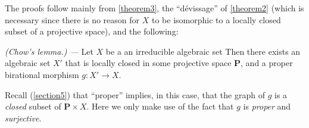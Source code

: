 \documentclass{article}
\theoremstyle{plain}
\newenvironment{lemma}[1]
    {\renewcommand\theinnercustomlemma{#1}\innercustomlemma}
    {\endinnercustomlemma}
\theoremstyle{definition}
\newcommand{\oldpage}[1]{\marginpar{\footnotesize$\Big\vert$ \textit{p.~#1}}}
\begin{document}
The proofs follow mainly from \cref{theorem3}, the ``d\'{e}vissage'' of \cref{theorem2} (which is necessary since there is no reason for $X$ to be isomorphic to a locally closed subset of a projective space), and the following:

\begin{lemma}{4}
\label{lemma4}
\emph{(Chow's lemma.) ---}
  Let $X$ be a an irreducible algebraic set
  Then there exists an algebraic set $X'$ that is locally closed in some projective space $\mathbf{P}$, and a proper birational morphism $g\colon X'\to X$.
\end{lemma}

Recall (\cref{section5}) that ``proper'' implies, in this case, that the graph of $g$
\oldpage{2-11}
is a \emph{closed} subset of $\mathbf{P}\times X$.
Here we only make use of the fact that $g$ is \emph{proper} and \emph{surjective}.
\end{document}
